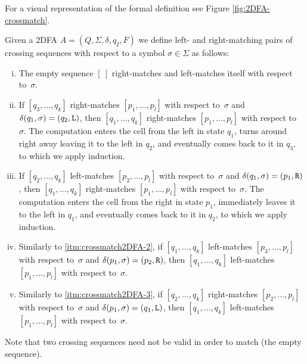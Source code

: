 For a visual representation of the formal definition see Figure \ref{fig:2DFA-crossmatch}.
\begin{defn}
	Given a 2DFA $A=(Q,\Sigma,\delta,q_I,F)$ we define left- and right-matching pairs of crossing sequences with respect to a symbol $\sigma\in\Sigma$ as follows:
	\begin{enumerate}[i.]
		\item \label{itm:crossmatch2DFA-1} The empty sequence $[~]$ right-matches and left-matches itself with respect to~$\sigma$.
		\item \label{itm:crossmatch2DFA-2} If $[q_3,\dots,q_k]$ right-matches $[p_1,\dots,p_l]$ with respect to~$\sigma$ and $\delta(q_1,\sigma)=(q_2,\mathtt L)$, then $[q_1,\dots,q_k]$ right-matches $[p_1,\dots,p_l]$ with respect to~$\sigma$.
		      The computation enters the cell from the left in state $q_1$, turns around right away leaving it to the left in $q_2$, and eventually comes back to it in $q_3$, to which we apply induction.
		\item \label{itm:crossmatch2DFA-3} If $[q_2,\dots,q_k]$ left-matches $[p_2,\dots,p_l]$ with respect to~$\sigma$ and $\delta(q_1,\sigma)=(p_1,\mathtt R)$, then $[q_1,\dots,q_k]$ right-matches $[p_1,\dots,p_l]$ with respect to~$\sigma$.
		      The computation enters the cell from the right in state $p_1$, immediately leaves it to the left in $q_1$, and eventually comes back to it in $q_2$, to which we apply induction.
		\item \label{itm:crossmatch2DFA-4} Similarly to \ref{itm:crossmatch2DFA-2}, if $[q_1,\dots,q_k]$ left-matches $[p_3,\dots,p_l]$ with respect to~$\sigma$ and $\delta(p_1,\sigma)=(p_2,\mathtt R)$, then $[q_1,\dots,q_k]$ left-matches $[p_1,\dots,p_l]$ with respect to~$\sigma$.
		\item \label{itm:crossmatch2DFA-5} Similarly to \ref{itm:crossmatch2DFA-3}, if $[q_2,\dots,q_k]$ right-matches $[p_2,\dots,p_l]$ with respect to~$\sigma$ and $\delta(p_1,\sigma)=(q_1,\mathtt L)$, then $[q_1,\dots,q_k]$ left-matches $[p_1,\dots,p_l]$ with respect to~$\sigma$.
	\end{enumerate}
\end{defn}
Note that two crossing sequences need not be valid in order to match (\eg the empty sequence).

